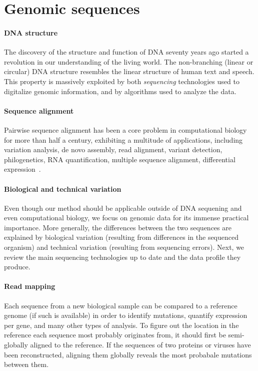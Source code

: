 \section*{Genomic sequences}

\paragraph{DNA structure}
The discovery of the structure and function of DNA\citep{watson1953structure}
seventy years ago started a revolution in our understanding of the living world.
The non-branching (linear or circular) DNA structure resembles the linear
structure of human text and speech. This property is massively exploited by both
\emph{sequencing} technologies used to digitalize genomic information, and by
algorithms used to analyze the data.

\paragraph{Sequence alignment}
Pairwise sequence alignment has been a core problem in computational biology for
more than half a century, exhibiting a multitude of applications, including
variation analysis, de novo assembly, read alignment, variant detection,
philogenetics, RNA quantification, multiple sequence alignment, differential
expression~\citep{prjibelski2018sequence}.

\paragraph{Biological and technical variation}
Even though our method should be applicable outside of DNA sequening and even
computational biology, we focus on genomic data for its immense practical
importance. More generally, the differences between the two sequences are
explained by biological variation (resulting from differences in the sequenced
organism) and technical variation (resulting from sequencing errors). Next, we
review the main sequencing technologies up to date and the data profile they
produce.

\paragraph{Read mapping}
Each sequence from a new biological sample can be compared to a reference genome
(if such is available) in order to identify mutations, quantify expression per
gene, and many other types of analysis. To figure out the location in the
reference each sequence most probably originates from, it should first be
semi-globally aligned to the reference. If the sequences of two proteins or
viruses have been reconstructed, aligning them globally reveals the most
probabale mutations between them.

